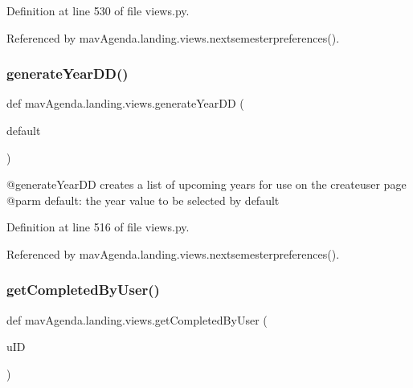 Definition at line 530 of file views.\+py.



Referenced by mav\+Agenda.\+landing.\+views.\+nextsemesterpreferences().

\mbox{\label{namespacemavAgenda_1_1landing_1_1views_a6d29704212cb7db9f5a2935dc1b037eb}} 
\subsubsection{\texorpdfstring{generate\+Year\+D\+D()}{generateYearDD()}}
{\footnotesize\ttfamily def mav\+Agenda.\+landing.\+views.\+generate\+Year\+DD (\begin{DoxyParamCaption}\item[{}]{default }\end{DoxyParamCaption})}

\begin{DoxyVerb}@generateYearDD creates a list of upcoming years for use on the createuser page
@parm default: the year value to be selected by default
\end{DoxyVerb}
 

Definition at line 516 of file views.\+py.



Referenced by mav\+Agenda.\+landing.\+views.\+nextsemesterpreferences().

\mbox{\label{namespacemavAgenda_1_1landing_1_1views_a348cf64ede97168dfaacf49cb86396aa}} 
\subsubsection{\texorpdfstring{get\+Completed\+By\+User()}{getCompletedByUser()}}
{\footnotesize\ttfamily def mav\+Agenda.\+landing.\+views.\+get\+Completed\+By\+User (\begin{DoxyParamCaption}\item[{}]{u\+ID }\end{DoxyParamCaption})}

